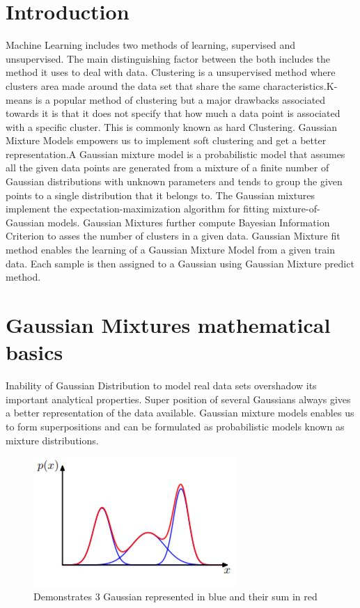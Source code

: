 \documentclass[conference]{IEEEtran}
\begin{document}
\section{Introduction}
Machine Learning includes two methods of learning, supervised and unsupervised.  The main distinguishing factor between the both includes the method it uses to deal with data. Clustering is a unsupervised method where clusters area made around the data set that share the same characteristics.K-means is a popular method of clustering but a major drawbacks associated towards it is that it does not specify that how much a data point is associated with a specific cluster. This is commonly known as hard Clustering. Gaussian Mixture Models empowers us to implement soft clustering and get a better representation.A Gaussian mixture model is a probabilistic model that assumes all the given data points are generated from a mixture of a finite number of Gaussian distributions with unknown parameters and tends to group the given points to a single distribution that it belongs to. The Gaussian mixtures implement the expectation-maximization algorithm for fitting mixture-of-Gaussian models. Gaussian Mixtures further compute Bayesian Information Criterion to asses the number of clusters in a given data. Gaussian Mixture fit method enables the learning of a Gaussian Mixture Model from a given train data. Each sample is then assigned to a Gaussian using Gaussian Mixture predict method.  

\section{Gaussian Mixtures mathematical basics}
Inability of Gaussian Distribution to model real data sets overshadow its important analytical properties. Super position of several Gaussians always gives a better representation of the data available. Gaussian mixture models enables us to form superpositions and can be formulated as probabilistic models known as mixture distributions.

\begin{figure}[h]
    \centering
    \includegraphics{Capture.JPG}
    \caption{Demonstrates 3 Gaussian represented in blue and their sum in red}
    \label{}
\end{figure}
\end{document}
